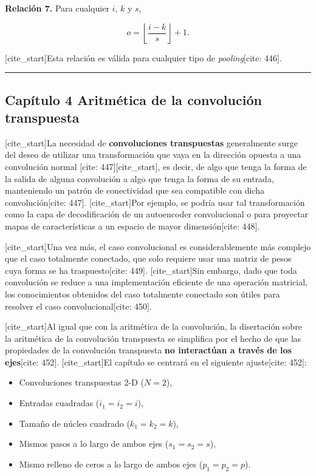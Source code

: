 \documentclass[
  super,
  preprint,
  3p]{elsarticle}
\providecommand{\tightlist}{%
  \setlength{\itemsep}{0pt}\setlength{\parskip}{0pt}}\usepackage{longtable,booktabs,array}
\begin{document}
\textbf{Relación 7.} Para cualquier \(i\), \(k\) y \(s\),

\[o = \left\lfloor \frac{i - k}{s} \right\rfloor + 1.\]

{[}cite\_start{]}Esta relación es válida para cualquier tipo de
\emph{pooling}{[}cite: 446{]}.

\begin{center}\rule{0.5\linewidth}{0.5pt}\end{center}

\subsection{Capítulo 4 Aritmética de la convolución
transpuesta}\label{capuxedtulo-4-aritmuxe9tica-de-la-convoluciuxf3n-transpuesta}

{[}cite\_start{]}La necesidad de \textbf{convoluciones transpuestas}
generalmente surge del deseo de utilizar una transformación que vaya en
la dirección opuesta a una convolución normal {[}cite:
447{]}{[}cite\_start{]}, es decir, de algo que tenga la forma de la
salida de alguna convolución a algo que tenga la forma de su entrada,
manteniendo un patrón de conectividad que sea compatible con dicha
convolución{[}cite: 447{]}. {[}cite\_start{]}Por ejemplo, se podría usar
tal transformación como la capa de decodificación de un autoencoder
convolucional o para proyectar mapas de características a un espacio de
mayor dimensión{[}cite: 448{]}.

{[}cite\_start{]}Una vez más, el caso convolucional es considerablemente
más complejo que el caso totalmente conectado, que solo requiere usar
una matriz de pesos cuya forma se ha traspuesto{[}cite: 449{]}.
{[}cite\_start{]}Sin embargo, dado que toda convolución se reduce a una
implementación eficiente de una operación matricial, los conocimientos
obtenidos del caso totalmente conectado son útiles para resolver el caso
convolucional{[}cite: 450{]}.

{[}cite\_start{]}Al igual que con la aritmética de la convolución, la
disertación sobre la aritmética de la convolución transpuesta se
simplifica por el hecho de que las propiedades de la convolución
transpuesta \textbf{no interactúan a través de los ejes}{[}cite: 452{]}.
{[}cite\_start{]}El capítulo se centrará en el siguiente ajuste{[}cite:
452{]}:

\begin{itemize}
\tightlist
\item
  Convoluciones transpuestas 2-D (\(N = 2\)),
\item
  Entradas cuadradas (\(i_1 = i_2 = i\)),
\item
  Tamaño de núcleo cuadrado (\(k_1 = k_2 = k\)),
\item
  Mismos pasos a lo largo de ambos ejes (\(s_1 = s_2 = s\)),
\item
  Mismo relleno de ceros a lo largo de ambos ejes (\(p_1 = p_2 = p\)).
\end{itemize}
\end{document}
